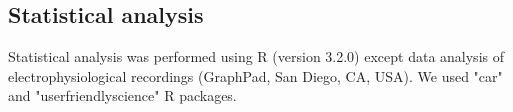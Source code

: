 \subsection*{Statistical analysis}

Statistical analysis was performed using R (version 3.2.0)\cite{R} except data analysis of electrophysiological recordings (GraphPad, San Diego, CA, USA).
We used "car"\cite{car} and "userfriendlyscience"\cite{user} R packages.

    
  
  
  
  
  
  
  
  
  
  